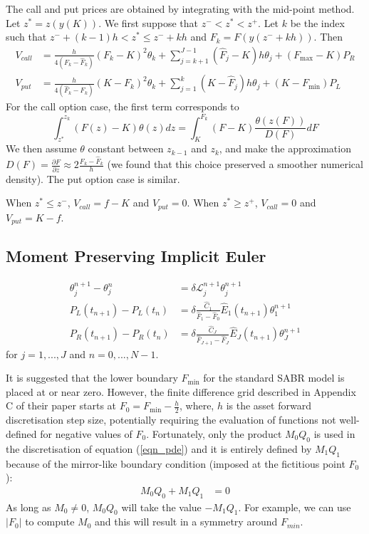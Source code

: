 \documentclass[]{rAMF2e}
\begin{document}
The call and put prices are obtained by integrating with the mid-point method. Let $z^* = z(y(K))$. We first suppose that $z^{-} < z^* < z^{+}$. Let $k$ be the index such that $z^{-}+(k-1)h < z^* \leq z^{-}+k h$ and $F_k = F(y(z^{-}+kh))$. Then
\begin{align*}
V_{call} &= \frac{h}{4(F_k-\hat{F}_k)}(F_k - K)^2 \theta_k 
+ \sum_{j=k+1}^{J-1} (\hat{F}_j - K) h \theta_j 
+ (F_{\max}-K) P_R\\
V_{put} &= \frac{h}{4(\hat{F}_k-F_k)}(K-F_k)^2 \theta_k 
+ \sum_{j=1}^{k} (K-\hat{F}_j) h \theta_j 
+ (K-F_{\min}) P_L
\end{align*}
For the call option case, the first term corresponds to 
\begin{equation}
\int_{z^*}^{z_k}(F(z)-K)\theta(z)dz = \int_{K}^{F_k}(F-K)\frac{\theta(z(F))}{D(F)}dF
\end{equation}
 We then assume $\theta$ constant between $z_{k-1}$ and $z_{k}$, and make the approximation $D(F)=\frac{\partial F}{\partial z} \approx 2\frac{F_k-\hat{F}_k}{h}$ (we found that this choice preserved a smoother numerical density). The put option case is similar.


When $z^* \leq z^{-}$, $V_{call} = f-K$ and $V_{put} = 0$. When $z^* \geq z^{+}$, $V_{call} = 0$ and $V_{put} = K-f$.

\subsection{Moment Preserving Implicit Euler}
\begin{subequations}
\begin{align}
\theta_j^{n+1}-\theta_j^n &= \delta \mathcal{L}_{j}^{n+1} \theta_j^{n+1} \\
P_L (t_{n+1}) - P_L (t_{n}) &= \delta \frac{\hat{C}_1}{\hat{F}_1-\hat{F}_0}\hat{E}_1(t_{n+1})\theta_1^{n+1} \\
P_R (t_{n+1}) -  P_R (t_{n}) &= \delta \frac{\hat{C}_J}{\hat{F}_{J+1}-\hat{F}_J}\hat{E}_J(t_{n+1})\theta_J^{n+1}
\end{align}
\end{subequations}
for $j=1,...,J$ and $n=0,...,N-1$.

It is suggested that the lower boundary $F_{\min}$ for the standard SABR model is placed at or near zero. However, the finite difference grid described in Appendix C of their paper starts at  $F_0 = F_{\min} - \frac{h}{2}$, where, $h$ is the asset forward discretisation step size, potentially requiring the evaluation of functions not well-defined for negative values of $F_0$. Fortunately, only the product $M_0 Q_0$ is used in the discretisation of equation (\ref{eqn_pde}) and it is entirely defined by $M_1 Q_1$  because of the mirror-like boundary condition (imposed at the fictitious point $F_0$): 
\begin{align}\label{boundary_condition}
M_0 Q_0 + M_1 Q_1 &= 0
\end{align}
As long as $M_0 \neq 0$, $M_0 Q_0$ will take the value $-M_1 Q_1$. For example, we can use $|F_0|$ to compute $M_0$ and this will result in a symmetry around $F_{min}$.
\end{document}
